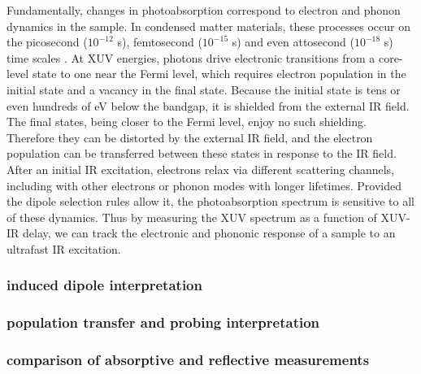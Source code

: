 Fundamentally, changes in photoabsorption correspond to electron and phonon dynamics in the sample. In condensed matter materials, these processes occur on the picosecond ($10^{-12}$ s), femtosecond ($10^{-15}$ s) and even attosecond ($10^{-18}$ s) time scales \cite{schultzeAttosecondBandgapDynamics2014,cushingDifferentiatingPhotoexcitedCarrier2019,zurchDirectSimultaneousObservation2017,volkovAttosecondScreeningDynamics2019}. At XUV energies, photons drive electronic transitions from a core-level state to one near the Fermi level, which requires electron population in the initial state and a vacancy in the final state. Because the initial state is tens or even hundreds of eV below the bandgap, it is shielded from the external IR field. The final states, being closer to the Fermi level, enjoy no such shielding. Therefore they can be distorted by the external IR field, and the electron population can be transferred between these states in response to the IR field. After an initial IR excitation, electrons relax via different scattering channels, including with other electrons or phonon modes with longer lifetimes. Provided the dipole selection rules allow it, the photoabsorption spectrum is sensitive to all of these dynamics. Thus by measuring the XUV spectrum as a function of XUV-IR delay, we can track the electronic and phononic response of a sample to an ultrafast IR excitation.


\subsubsection{induced dipole interpretation}

\subsubsection{population transfer and probing interpretation}

\subsubsection{comparison of absorptive and reflective measurements}


